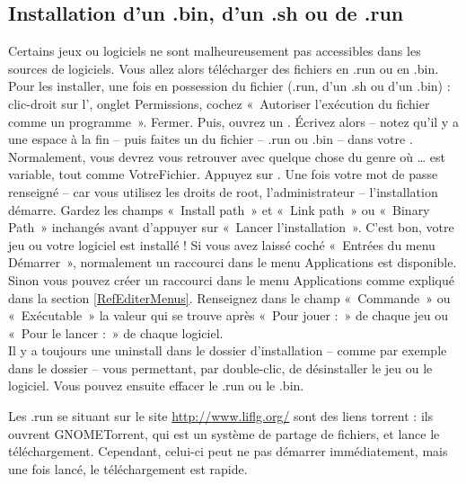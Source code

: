 \subsection{Installation d'un .bin, d'un .sh ou de .run}
Certains jeux ou logiciels ne sont malheureusement pas accessibles dans les sources de logiciels. Vous allez alors télécharger des fichiers en .run ou en .bin. Pour les installer, une fois en possession du fichier (.run, d'un .sh ou d'un .bin) : clic-droit sur l', onglet Permissions, cochez  «~Autoriser l'exécution du fichier comme un programme~». Fermer. Puis, ouvrez un . Écrivez alors  -- notez qu'il y a une espace à la fin -- puis faites un  du fichier -- .run ou .bin -- dans votre . Normalement, vous devrez vous retrouver avec quelque chose du genre  où \ldots{} est variable, tout comme VotreFichier. Appuyez sur . Une fois votre mot de passe renseigné -- car vous utilisez les droits de root, l'administrateur -- l'installation démarre. Gardez les champs «~Install path~» et «~Link path~» ou «~Binary Path~» inchangés avant d'appuyer sur «~Lancer l'installation~». C'est bon, votre jeu ou votre logiciel est installé ! Si vous avez laissé coché «~Entrées du menu Démarrer~», normalement un raccourci dans le menu Applications est disponible. Sinon vous pouvez créer un raccourci dans le menu Applications comme expliqué dans la section \ref{RefEditerMenus}. Renseignez dans le champ «~Commande~» ou «~Exécutable~» la valeur qui se trouve après «~Pour jouer :~» de chaque jeu ou «~Pour le lancer :~» de chaque logiciel.\\
Il y a toujours une  uninstall dans le dossier d'installation -- comme par exemple dans le dossier  -- vous permettant, par double-clic, de désinstaller le jeu ou le logiciel. Vous pouvez ensuite effacer le .run ou le .bin.\par
\begin{nota}
Les .run se situant sur le site \url{http://www.liflg.org/} sont des liens torrent : ils ouvrent GNOMETorrent, qui est un système de partage de fichiers, et lance le téléchargement. Cependant, celui-ci peut ne pas démarrer immédiatement, mais une fois lancé, le téléchargement est rapide.
\end{nota}
